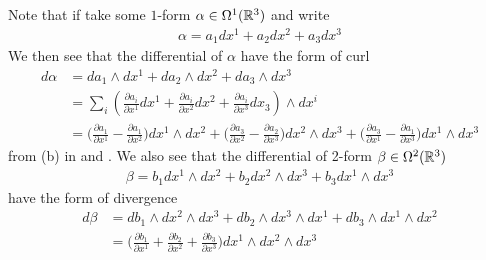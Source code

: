 \documentclass{report}
\begin{document}
\begin{mdframed}
Note that if take some $1$-form  $\alpha \in \Omega^1(\mathbb{R}^3)$ and write 
\begin{align*}
\alpha =a_1dx^1 + a_2dx^2+a_3dx^3
\end{align*}
We then see that the differential of $\alpha $ have the form of curl 
\begin{align*}
d\alpha &= da_1 \wedge  dx^1 + da_2\wedge  dx^2 +da_3\wedge   dx^3   \\
&=  \sum_i (\frac{\partial a_i}{\partial x^1}dx^1+\frac{\partial a_i}{\partial x^2}dx^2+ \frac{\partial a_i}{\partial x^3}dx_3)\wedge  dx^i \\
&=\Big(\frac{\partial a_1}{\partial x^1}-\frac{\partial a_1}{\partial x^2}\Big) dx^1 \wedge  dx^2 + \Big( \frac{\partial a_3}{\partial x^2}- \frac{\partial a_2}{\partial x^3} \Big)dx^2 \wedge  dx^3+ \Big( \frac{\partial a_3}{\partial x^1}- \frac{\partial a_1}{\partial x^3} \Big) dx^1\wedge  dx^3 
\end{align*}
from (b) in  and . We also see that the differential of 2-form $\beta \in \Omega^2(\mathbb{R}^3)$ 
\begin{align*}
\beta =b_1 dx^1 \wedge  dx^2 + b_2 dx^2\wedge  dx^3 + b_3 dx^1 \wedge  dx^3   
\end{align*}
have the form of divergence
\begin{align*}
d\beta  &=db_1 \wedge  dx^2\wedge  dx^3+ db_2 \wedge  dx^3 \wedge  dx^1 + db_3 \wedge  dx^1\wedge  dx^2      \\
&= \Big( \frac{\partial b_1}{\partial x^1} + \frac{\partial b_2}{\partial x^2}+ \frac{\partial b_3}{\partial x^3} \Big) dx^1 \wedge  dx^2 \wedge  dx^3  
\end{align*}
\end{mdframed}
\end{document}
